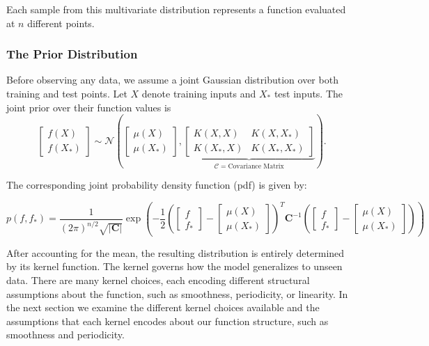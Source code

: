 \documentclass[12pt]{article}
\begin{document}
\noindent
Each sample from this multivariate distribution represents a function evaluated at \( n \) different points.

\subsubsection*{The Prior Distribution}
\label{sec: prior_dist}

Before observing any data, we assume a joint Gaussian distribution over both training and test points. Let \( X \) denote training inputs and \( X_* \) test inputs. 
The joint prior over their function values is
\begin{equation}
\begin{bmatrix}
f(X) \\
f(X_*)
\end{bmatrix}
\sim \mathcal{N}
\left(
\begin{bmatrix}
\mu(X) \\
\mu(X_*)
\end{bmatrix},
\underbrace{
\begin{bmatrix}
K(X, X) & K(X, X_*) \\
K(X_*, X) & K(X_*, X_*)
\end{bmatrix}
}_{\mathcal{C} = \text{Covariance Matrix}}
\right).
\label{eq: Multivariate prior}
\end{equation}

\noindent
The corresponding joint probability density function (pdf) is given by:

\begin{equation}
    p(f, f_*) = \frac{1}{(2\pi)^{n/2} \sqrt{|\mathbf{C}|}} \exp\left( 
    - \frac{1}{2}\left(\begin{bmatrix}f \\f_*\end{bmatrix}-
    \begin{bmatrix}\mu(X) \\\mu(X_*)\end{bmatrix}\right)^T
    \mathbf{C}^{-1}\left(
    \begin{bmatrix}f \\f_*\end{bmatrix}-
    \begin{bmatrix}\mu(X) \\\mu(X_*)\end{bmatrix}\right)\right)
\end{equation}
    

\noindent
After accounting for the mean, the resulting distribution is entirely determined by its kernel function.
The kernel governs how the model generalizes to unseen data. There are many kernel choices, each encoding different structural assumptions about the function, such as smoothness, periodicity, or linearity.
In the next section we examine the different kernel choices available and the assumptions that each kernel encodes about our function structure, such as smoothness and periodicity.
\end{document}
